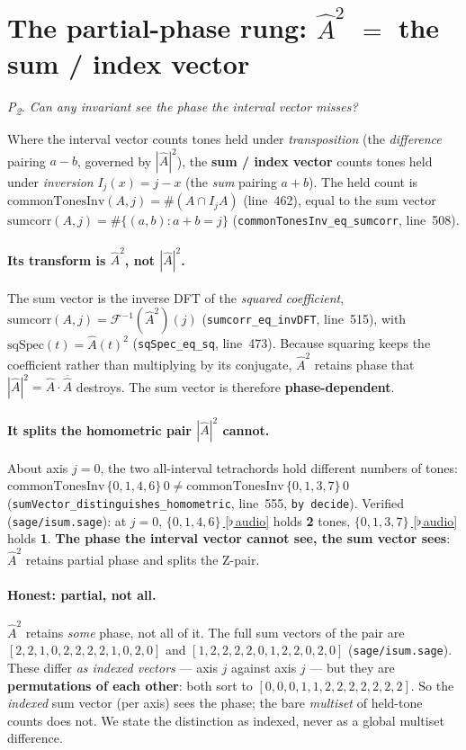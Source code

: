 \documentclass[11pt]{article}
\newcommand{\lean}[1]{\texttt{#1}}
\newcommand{\Ahat}{\hat{A}}
\newcommand{\Fi}{\mathcal{F}^{-1}}
\newcommand{\question}[1]{\smallskip\noindent\textit{#1}\smallskip}
\newcommand{\audiobase}{https://github.com/karlesmarin/music-math/raw/main/media}
\newcommand{\audio}[1]{\href{\audiobase/#1}{\textcolor{ctA}{\footnotesize\,[$\flat$\,audio]}}}
\begin{document}
\section{The partial-phase rung: \texorpdfstring{$\Ahat^2$}{A^2} \texorpdfstring{$=$}{=} the sum / index vector}\label{sec:partial}

\question{P\textsubscript{2}. Can any invariant see the phase the interval vector misses?}

Where the interval vector counts tones held under \emph{transposition} (the \emph{difference} pairing
$a-b$, governed by $|\Ahat|^2$), the \textbf{sum / index vector} counts tones held under \emph{inversion}
$I_j(x)=j-x$ (the \emph{sum} pairing $a+b$). The held count is
$\mathrm{commonTonesInv}(A,j)=\#(A\cap I_jA)$ (line~462), equal to the sum vector
$\mathrm{sumcorr}(A,j)=\#\{(a,b):a+b=j\}$ (\lean{commonTonesInv\_eq\_sumcorr}, line~508).

\paragraph{Its transform is $\Ahat^2$, not $|\Ahat|^2$.} The sum vector is the inverse DFT of the
\emph{squared coefficient}, $\mathrm{sumcorr}(A,j)=\Fi(\Ahat^2)(j)$ (\lean{sumcorr\_eq\_invDFT},
line~515), with $\mathrm{sqSpec}(t)=\Ahat(t)^2$ (\lean{sqSpec\_eq\_sq}, line~473). Because squaring keeps
the coefficient rather than multiplying by its conjugate, $\Ahat^2$ retains phase that
$|\Ahat|^2=\Ahat\cdot\overline{\Ahat}$ destroys. The sum vector is therefore \textbf{phase-dependent}.

\paragraph{It splits the homometric pair $|\Ahat|^2$ cannot.} About axis $j=0$, the two all-interval
tetrachords hold different numbers of tones:
$\mathrm{commonTonesInv}\,\{0,1,4,6\}\,0\ne\mathrm{commonTonesInv}\,\{0,1,3,7\}\,0$
(\lean{sumVector\_distinguishes\_homometric}, line~555, \lean{by decide}). Verified
(\lean{sage/isum.sage}): at $j=0$, $\{0,1,4,6\}$\,\audio{inversion_4z15.wav} holds \textbf{2} tones,
$\{0,1,3,7\}$\,\audio{inversion_4z29.wav} holds \textbf{1}. \textbf{The phase the interval vector cannot
see, the sum vector sees}: $\Ahat^2$ retains partial phase and splits the Z-pair.

\paragraph{Honest: partial, not all.} $\Ahat^2$ retains \emph{some} phase, not all of it. The full sum
vectors of the pair are $[2,2,1,0,2,2,2,2,1,0,2,0]$ and $[1,2,2,2,2,0,1,2,2,0,2,0]$
(\lean{sage/isum.sage}). These differ \emph{as indexed vectors} --- axis $j$ against axis $j$ --- but they
are \textbf{permutations of each other}: both sort to $[0,0,0,1,1,2,2,2,2,2,2,2]$. So the \emph{indexed}
sum vector (per axis) sees the phase; the bare \emph{multiset} of held-tone counts does not. We state the
distinction as indexed, never as a global multiset difference.
\end{document}
